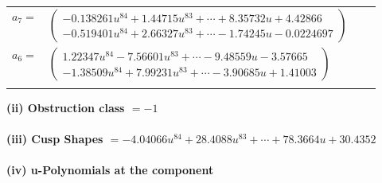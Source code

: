 \documentclass[1p]{elsarticle_modified}
\theoremstyle{definition}
\begin{document}
\begin{tabular}{m{7pt} m{180pt} m{7pt} m{180pt} }
\flushright $a_{7}=$&$\begin{pmatrix}-0.138261 u^{84}+1.44715 u^{83}+\cdots+8.35732 u+4.42866\\-0.519401 u^{84}+2.66327 u^{83}+\cdots-1.74245 u-0.0224697\end{pmatrix}$ \\
\flushright $a_{6}=$&$\begin{pmatrix}1.22347 u^{84}-7.56601 u^{83}+\cdots-9.48559 u-3.57665\\-1.38509 u^{84}+7.99231 u^{83}+\cdots-3.90685 u+1.41003\end{pmatrix}$\\&\end{tabular}
\flushleft \textbf{(ii) Obstruction class $= -1$}\\~\\
\flushleft \textbf{(iii) Cusp Shapes $= -4.04066 u^{84}+28.4088 u^{83}+\cdots+78.3664 u+30.4352$}\\~\\
\newpage\renewcommand{\arraystretch}{1}
\flushleft \textbf{(iv) u-Polynomials at the component}\newline \\
\end{document}
